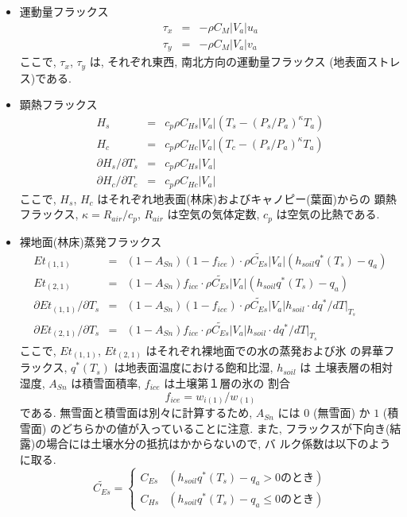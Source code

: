 \begin{itemize}

\item 運動量フラックス
 \begin{eqnarray}
 \tau_x &=& - \rho C_{M}|V_a| u_a \\
 \tau_y &=& - \rho C_{M}|V_a| v_a
 \end{eqnarray}
ここで, $\tau_x$, $\tau_y$ は, それぞれ東西, 南北方向の運動量フラックス
(地表面ストレス)である.

\item 顕熱フラックス
 \begin{eqnarray}
 H_s &=& c_p \rho C_{Hs}|V_a| (T_s - (P_s/P_a)^{\kappa}T_a)
 \label{flux_start} \\
 H_c &=& c_p \rho C_{Hc}|V_a| (T_c - (P_s/P_a)^{\kappa}T_a) \\
 \partial H_s/\partial T_s &=& c_p \rho C_{Hs}|V_a| \\
 \partial H_c/\partial T_c &=& c_p \rho C_{Hc}|V_a|
 \end{eqnarray}
ここで, $H_s$, $H_c$ はそれぞれ地表面(林床)およびキャノピー(葉面)からの
顕熱フラックス, $\kappa = R_{air} / c_p$, $R_{air}$ は空気の気体定数,
$c_p$ は空気の比熱である.

\item 裸地面(林床)蒸発フラックス
 \begin{eqnarray}
 Et_{(1,1)} &=& (1-A_{Sn})(1-f_{ice})\cdot
           \rho \widetilde{C_{Es}}|V_a|(h_{soil}q^*(T_s) - q_a) \\
 Et_{(2,1)} &=& (1-A_{Sn})f_{ice}\cdot
           \rho \widetilde{C_{Es}}|V_a|(h_{soil}q^*(T_s) - q_a) \\
 \partial Et_{(1,1)}/\partial T_s &=& (1-A_{Sn})(1-f_{ice})\cdot
           \rho \widetilde{C_{Es}}|V_a|h_{soil}\cdot dq^*/dT |_{T_s} \\
 \partial Et_{(2,1)}/\partial T_s &=& (1-A_{Sn})f_{ice}\cdot
           \rho \widetilde{C_{Es}}|V_a|h_{soil}\cdot dq^*/dT |_{T_s}
 \end{eqnarray}
ここで, $Et_{(1,1)}$, $Et_{(2,1)}$ はそれぞれ裸地面での水の蒸発および氷
の昇華フラックス, $q^*(T_s)$ は地表面温度における飽和比湿, $h_{soil}$ は
土壌表層の相対湿度, $A_{Sn}$ は積雪面積率, $f_{ice}$ は土壌第１層の氷の
割合
 \begin{equation}
  f_{ice} = w_{i(1)}/w_{(1)}
 \end{equation}
である.
無雪面と積雪面は別々に計算するため, $A_{Sn}$ には $0$ (無雪面) か $1$
(積雪面) のどちらかの値が入っていることに注意.
また, フラックスが下向き(結露)の場合には土壌水分の抵抗はかからないので, バ
ルク係数は以下のように取る.
 \begin{equation}
  \widetilde{C_{Es}} = \left\{
  \begin{array}{ll}
   C_{Es}& (h_{soil}q^*(T_s) - q_a > 0 \mbox{のとき})\\
   C_{Hs}& (h_{soil}q^*(T_s) - q_a \leq 0 \mbox{のとき})
  \end{array}
  \right.
 \end{equation}


\end{itemize}
